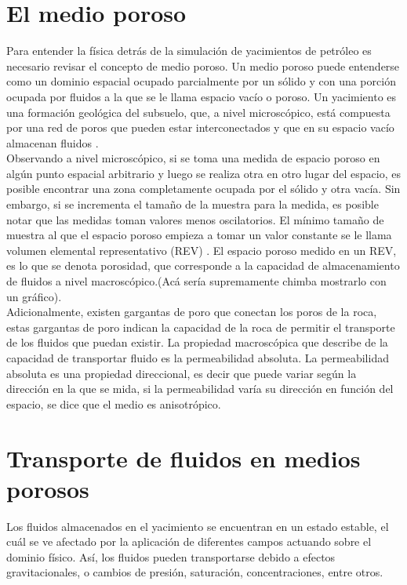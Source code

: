 \section{El medio poroso}

Para entender la física detrás de la simulación de yacimientos de petróleo es necesario revisar el concepto de medio poroso. Un medio poroso puede entenderse como un dominio espacial ocupado parcialmente por un sólido y con una porción ocupada por fluidos a la que se le llama espacio vacío o poroso. Un yacimiento es una formación geológica del subsuelo, que, a nivel microscópico, está compuesta por una red de poros que pueden estar interconectados y que en su espacio vacío almacenan fluidos \citep{Bear2018}.\\

Observando a nivel microscópico, si se toma una medida de espacio poroso en algún punto espacial arbitrario y luego se realiza otra en otro lugar del espacio, es posible encontrar una zona completamente ocupada por el sólido y otra vacía. Sin embargo, si se incrementa el tamaño de la muestra para la medida, es posible notar que las medidas toman valores menos oscilatorios. El mínimo tamaño de muestra al que el espacio poroso empieza a tomar un valor constante se le llama volumen elemental representativo (REV) \citep{Bear2018}. El espacio poroso medido en un REV, es lo que se denota porosidad, que corresponde a la capacidad de almacenamiento de fluidos a nivel macroscópico.(Acá sería supremamente chimba mostrarlo con un gráfico).\\

Adicionalmente, existen gargantas de poro que conectan los poros de la roca, estas gargantas de poro indican la capacidad de la roca de permitir el transporte de los fluidos que puedan existir. La propiedad macroscópica que describe de la capacidad de transportar fluido es la permeabilidad absoluta. La permeabilidad absoluta es una propiedad direccional, es decir que puede variar según la dirección en la que se mida, si la permeabilidad varía su dirección en función del espacio, se dice que el medio es anisotrópico.

\section{Transporte de fluidos en medios porosos}

Los fluidos almacenados en el yacimiento se encuentran en un estado estable, el cuál se ve afectado por la aplicación de diferentes campos actuando sobre el dominio físico. Así, los fluidos pueden transportarse debido a efectos gravitacionales, o cambios de presión, saturación, concentraciones, entre otros. %



